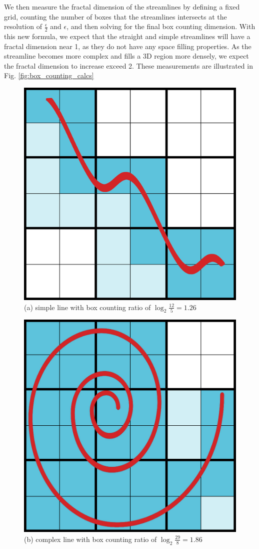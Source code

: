 \documentclass[journal]{vgtc}                %
\begin{document}
We then measure the fractal dimension of the streamlines by defining a fixed grid, counting the number of boxes that the streamlines intersects at the resolution of $\frac{\epsilon}{2}$ and ${\epsilon}$, and then solving for the final box counting dimension.
With this new formula, we expect that the straight and simple streamlines will have a fractal dimension near 1, as they do not have any space filling properties.
As the streamline becomes more complex and fills a 3D region more densely, we expect the fractal dimension to increase exceed 2.
These measurements are illustrated in Fig. \ref{fig:box_counting_calcs}

\begin{figure}[t]
	\centering
		\begin{minipage}{0.47\linewidth}
			\centering \small
			\includegraphics[height = 0.7\linewidth]{line.png}\\(a) simple line with box counting ratio of $\log_2\frac{12}{5} = 1.26$\vspace{0.2em}
		\end{minipage}
		\begin{minipage}{0.47\linewidth}
			\centering \small
			\includegraphics[height = 0.7\linewidth]{spiral.jpg}\\(b) complex line with box counting ratio of $\log_2\frac{29}{8} = 1.86$\vspace{0.2em}

\end{minipage}
\end{figure}
\end{document}
